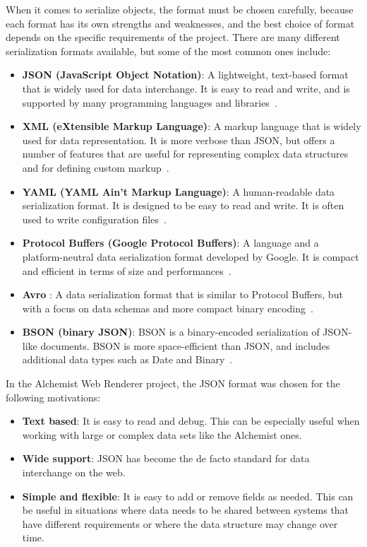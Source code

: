 When it comes to serialize objects, the format must be chosen carefully, because each format has its own strengths and weaknesses, and the best choice of format depends on the specific requirements of the project. There are many different serialization formats available, but some of the most common ones include:
\begin{itemize}
	\item \textbf{JSON (JavaScript Object Notation)}: A lightweight, text-based format that is widely used for data interchange. It is easy to read and write, and is supported by many programming languages and libraries~\cite{JSON74:online}.
	\item \textbf{XML (eXtensible Markup Language)}: A markup language that is widely used for data representation. It is more verbose than JSON, but offers a number of features that are useful for representing complex data structures and for defining custom markup~\cite{Extensib95:online}.
	\item \textbf{YAML (YAML Ain't Markup Language)}: A human-readable data serialization format. It is designed to be easy to read and write. It is often used to write configuration files~\cite{WhatisYA36:online}.
	\item \textbf{Protocol Buffers (Google Protocol Buffers)}: A language and a platform-neutral data serialization format developed by Google. It is compact and efficient in terms of size and performances~\cite{Protocol60:online}.
	\item \textbf{Avro} : A data serialization format that is similar to Protocol Buffers, but with a focus on data schemas and more compact binary encoding~\cite{WhatisAv78:online}.
	\item \textbf{BSON (binary JSON)}: BSON is a binary-encoded serialization of JSON-like documents. BSON is more space-efficient than JSON, and includes additional data types such as Date and Binary~\cite{Explaini59:online}.
\end{itemize}

In the Alchemist Web Renderer project, the JSON format was chosen for the following motivations:
\begin{itemize}
	\item \textbf{Text based}: It is easy to read and debug. This can be especially useful when working with large or complex data sets like the Alchemist ones.
	\item \textbf{Wide support}: JSON has become the de facto standard for data interchange on the web.
	\item \textbf{Simple and flexible}: It is easy to add or remove fields as needed. This can be useful in situations where data needs to be shared between systems that have different requirements or where the data structure may change over time.
\end{itemize}

